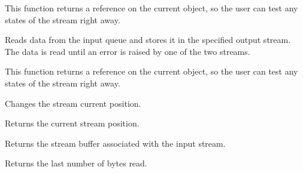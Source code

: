 
This function returns a reference on the current object, so the user can test
any states of the stream right away.


Reads data from the input queue and stores it in the specified output stream.
The data is read until an error is raised by one of the two streams.


This function returns a reference on the current object, so the user can test
any states of the stream right away.



Changes the stream current position.



Returns the current stream position.



Returns the stream buffer associated with the input stream.



Returns the last number of bytes read.

